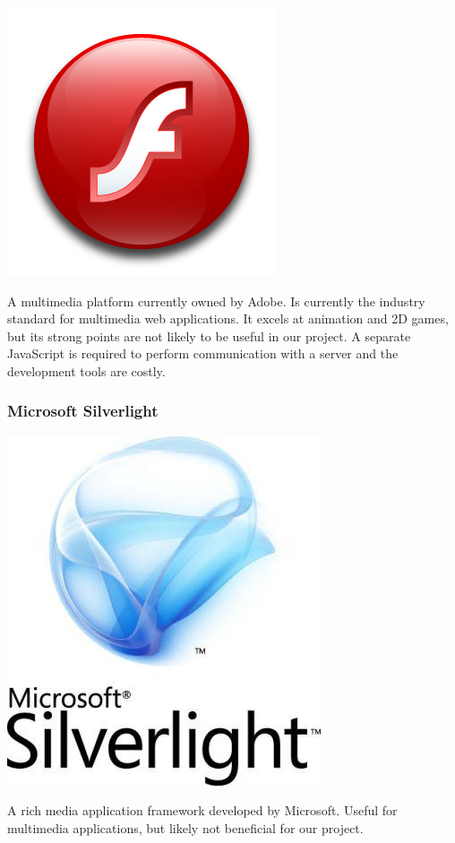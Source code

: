 \includegraphics[scale=0.225]{image/flash-logo.png}

A multimedia platform currently owned by Adobe. Is currently the industry standard for multimedia web applications. It excels at animation and 2D games, but its strong points are not likely to be useful in our project. A separate JavaScript is required to perform communication with a server and the development tools are costly.

\subsubsection{Microsoft Silverlight}

\includegraphics[scale=0.2]{image/silverlight-logo.jpg}

A rich media application framework developed by Microsoft. Useful for multimedia applications, but likely not beneficial for our project.

